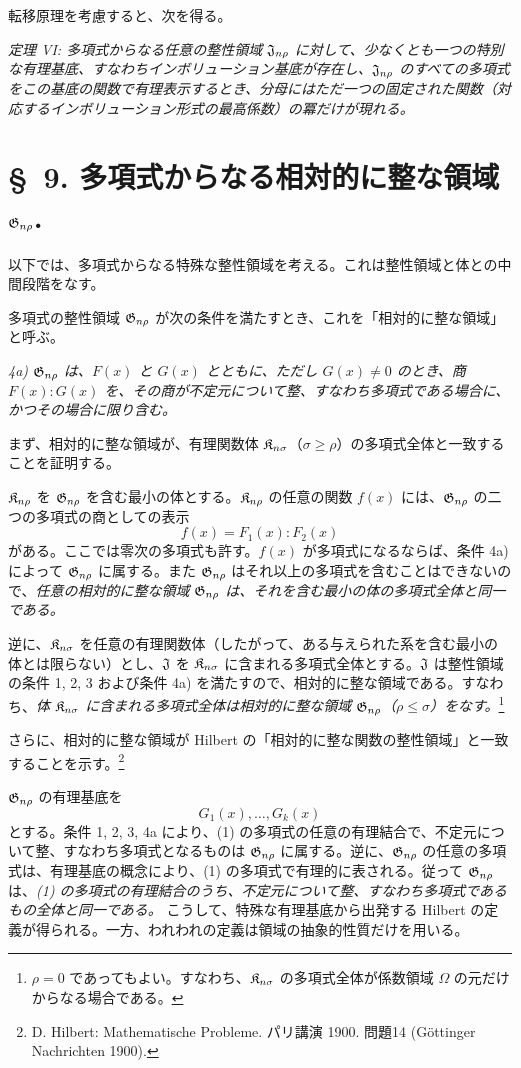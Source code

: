 \documentclass[11pt]{article}
\begin{document}
転移原理を考慮すると、次を得る。

\emph{定理 VI: 多項式からなる任意の整性領域 $\mathfrak{J}_{n\rho}$ に対して、少なくとも一つの特別な有理基底、すなわちインボリューション基底が存在し、$\mathfrak{J}_{n\rho}$ のすべての多項式をこの基底の関数で有理表示するとき、分母にはただ一つの固定された関数（対応するインボリューション形式の最高係数）の冪だけが現れる。}

\section*{\S\ 9. 多項式からなる相対的に整な領域 $\mathfrak{G}_{n\rho}$.}

以下では、多項式からなる特殊な整性領域を考える。これは整性領域と体との中間段階をなす。

多項式の整性領域 $\mathfrak{G}_{n\rho}$ が次の条件を満たすとき、これを「相対的に整な領域」と呼ぶ。

\emph{4a) $\mathfrak{G}_{n\rho}$ は、$F(x)$ と $G(x)$ とともに、ただし $G(x)\ne0$ のとき、商 $F(x):G(x)$ を、その商が不定元について整、すなわち多項式である場合に、かつその場合に限り含む。}

まず、相対的に整な領域が、有理関数体 $\mathfrak{K}_{n\sigma}$（$\sigma\ge\rho$）の多項式全体と一致することを証明する。

$\mathfrak{K}_{n\rho}$ を $\mathfrak{G}_{n\rho}$ を含む最小の体とする。$\mathfrak{K}_{n\rho}$ の任意の関数 $f(x)$ には、$\mathfrak{G}_{n\rho}$ の二つの多項式の商としての表示
\[
  f(x)=F_1(x):F_2(x)
\]
がある。ここでは零次の多項式も許す。$f(x)$ が多項式になるならば、条件 4a) によって $\mathfrak{G}_{n\rho}$ に属する。また $\mathfrak{G}_{n\rho}$ はそれ以上の多項式を含むことはできないので、\emph{任意の相対的に整な領域 $\mathfrak{G}_{n\rho}$ は、それを含む最小の体の多項式全体と同一である。}

逆に、$\mathfrak{K}_{n\sigma}$ を任意の有理関数体（したがって、ある与えられた系を含む最小の体とは限らない）とし、$\mathfrak{J}$ を $\mathfrak{K}_{n\sigma}$ に含まれる多項式全体とする。$\mathfrak{J}$ は整性領域の条件 1, 2, 3 および条件 4a) を満たすので、相対的に整な領域である。すなわち、\emph{体 $\mathfrak{K}_{n\sigma}$ に含まれる多項式全体は相対的に整な領域 $\mathfrak{G}_{n\rho}$（$\rho\le\sigma$）をなす。}\footnote{$\rho=0$ であってもよい。すなわち、$\mathfrak{K}_{n\sigma}$ の多項式全体が係数領域 $\Omega$ の元だけからなる場合である。}

さらに、相対的に整な領域が Hilbert の「相対的に整な関数の整性領域」と一致することを示す。\footnote{D. Hilbert: Mathematische Probleme. パリ講演 1900. 問題14 (Göttinger Nachrichten 1900).}

$\mathfrak{G}_{n\rho}$ の有理基底を
\begin{equation}
  G_1(x),\ldots,G_k(x)
\tag{1}
\end{equation}
とする。条件 1, 2, 3, 4a により、(1) の多項式の任意の有理結合で、不定元について整、すなわち多項式となるものは $\mathfrak{G}_{n\rho}$ に属する。逆に、$\mathfrak{G}_{n\rho}$ の任意の多項式は、有理基底の概念により、(1) の多項式で有理的に表される。従って $\mathfrak{G}_{n\rho}$ は、\emph{(1) の多項式の有理結合のうち、不定元について整、すなわち多項式であるもの全体と同一である。} こうして、特殊な有理基底から出発する Hilbert の定義が得られる。一方、われわれの定義は領域の抽象的性質だけを用いる。
\end{document}
